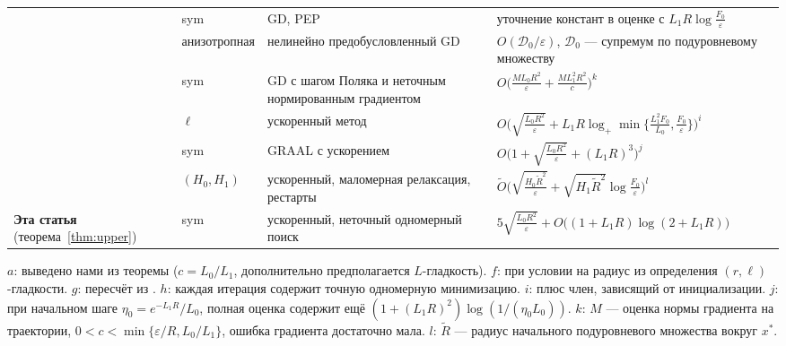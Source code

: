 \begin{center}
\begin{tabularx}{\linewidth}{@{}P{.2\linewidth}lP{.2\linewidth}Y@{}}
\citet{krivchenko2026computer} & sym & GD, PEP & уточнение констант в оценке с $L_1R\log\frac{F_0}{\varepsilon}$\\
\citet{oikonomidis2025nonlinearly} & анизотропная & нелинейно предобусловленный GD & $O(\mathcal D_0/\varepsilon)$, $\mathcal D_0$ --- супремум по подуровневому множеству\\
\citet{kovalev2026normalized} & sym & GD с шагом Поляка и неточным нормированным градиентом & $O\bigl(\frac{ML_0R^2}{\varepsilon}+\frac{ML_1^2R^2}{c}\bigr)^{k}$\\
\citet{tyurin2026accelerated} & $\ell$ & ускоренный метод & $O\bigl(\sqrt{\frac{L_0R^2}{\varepsilon}}+L_1R\log_+\min\bigl\{\frac{L_1^2F_0}{L_0},\frac{F_0}{\varepsilon}\bigr\}\bigr)^{i}$\\
\citet{borodich2026graal} & sym & GRAAL с ускорением & $O\bigl(1+\sqrt{\frac{L_0R^2}{\varepsilon}}+(L_1R)^3\bigr)^{j}$\\
\citet{lobanov2026accelerated} & $(H_0,H_1)$ & ускоренный, маломерная релаксация, рестарты & $\widetilde O\bigl(\sqrt{\frac{H_0\tilde R^2}{\varepsilon}}+\sqrt{H_1\tilde R^2}\log\frac{F_0}{\varepsilon}\bigr)^{l}$\\
\midrule
\textbf{Эта статья} (теорема~\ref{thm:upper}) & sym & ускоренный, неточный одномерный поиск & $5\sqrt{\frac{L_0R^2}{\varepsilon}}+O\bigl((1+L_1R)\log(2+L_1R)\bigr)$\\
\bottomrule
\end{tabularx}
\par\smallskip\raggedright
$a$: выведено нами из теоремы ($c=L_0/L_1$, дополнительно предполагается $L$-гладкость). $f$: при условии на радиус из определения $(r,\ell)$-гладкости. $g$: пересчёт из \citet{vankov2025optimizing}. $h$: каждая итерация содержит точную одномерную минимизацию. $i$: плюс член, зависящий от инициализации. $j$: при начальном шаге $\eta_0=e^{-L_1R}/L_0$, полная оценка содержит ещё $(1+(L_1R)^2)\log(1/(\eta_0L_0))$. $k$: $M$ --- оценка нормы градиента на траектории, $0<c<\min\{\varepsilon/R,L_0/L_1\}$, ошибка градиента достаточно мала. $l$: $\tilde R$ --- радиус начального подуровневого множества вокруг $x^\ast$.
\end{center}

